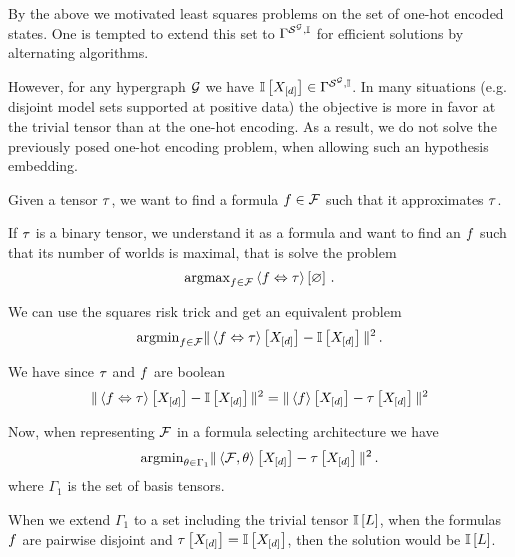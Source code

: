 
By the above we motivated least squares problems on the set of one-hot encoded states.
One is tempted to extend this set to $\Gamma^{\mathcal{S}^{\mathcal{G}},\mathbb{I}}$ for efficient solutions by alternating algorithms.

However, for any hypergraph $\mathcal{G}$ we have $\mathbb{I}\left[X_{[d]}\right]\in\Gamma^{\mathcal{S}^{\mathcal{G}},\mathbb{I}}$.
In many situations (e.g. disjoint model sets supported at positive data) the objective is more in favor at the trivial tensor than at the one-hot encoding.
As a result, we do not solve the previously posed one-hot encoding problem, when allowing such an hypothesis embedding.


\begin{example}\label{exa:formulaFitting}
	Given a tensor $\tau$, we want to find a formula $f\in\mathcal{F}$ such that it approximates $\tau$.

	If $\tau$ is a binary tensor, we understand it as a formula and want to find an $f$ such that its number of worlds is maximal, that is solve the problem
		\[ \mathrm{argmax}_{f\in\mathcal{F}}\left\langle f\Leftrightarrow\tau\right\rangle \left[ \varnothing \right]  \, . \]

	We can use the squares risk trick and get an equivalent problem
		\[ \mathrm{argmin}_{f\in\mathcal{F}} \|\left\langle f\Leftrightarrow\tau\right\rangle \left[ X_{[d]} \right]  - \mathbb{I}\left[X_{[d]}\right] \|^2 \, . \]

	We have since $\tau$ and $f$ are boolean
	\begin{align*}
		\|\left\langle f\Leftrightarrow\tau\right\rangle \left[ X_{[d]} \right]  - \mathbb{I}\left[X_{[d]}\right] \|^2
		= 	\|\left\langle f\right\rangle \left[ X_{[d]} \right]  - \tau\left[X_{[d]}\right] \|^2
	\end{align*}

	Now, when representing $\mathcal{F}$ in a formula selecting architecture we have
		\[ \mathrm{argmin}_{\theta\in\Gamma_1} \|\left\langle \mathcal{F},\theta\right\rangle \left[ X_{[d]} \right]  - \tau\left[X_{[d]}\right]\|^2 \, . \]
	where $\Gamma_1$ is the set of basis tensors.

	When we extend $\Gamma_1$ to a set including the trivial tensor $\mathbb{I}\left[L\right]$, when the formulas $f$ are pairwise disjoint and $\tau\left[X_{[d]}\right]=\mathbb{I}\left[X_{[d]}\right]$, then the solution would be $\mathbb{I}\left[L\right]$.

\end{example}


